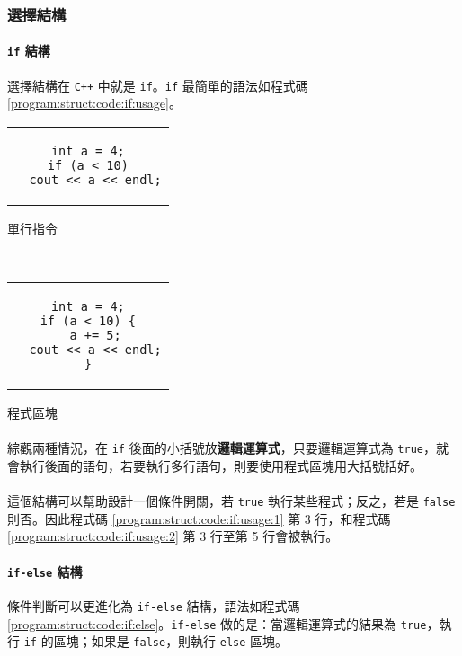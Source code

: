 \documentclass[12pt,a4paper,oneside]{article}
\begin{document}
\begin{CJK}{UTF8}{bkai}
\subsubsection{選擇結構}

\paragraph{\lstinline!if! 結構}選擇結構在 \texttt{C++} 中就是 \lstinline!if!。\lstinline!if! 最簡單的語法如程式碼 \ref{program:struct:code:if:usage}。

\begin{code}[h!]
\centering
\begin{subcode}{.4\textwidth}
  \centering
  \begin{tabular}{c}
  \begin{lstlisting}
int a = 4;
if (a < 10)
  cout << a << endl;
  \end{lstlisting}
  \end{tabular}
  \caption{單行指令}
  \label{program:struct:code:if:usage:1}
\end{subcode}
~
\begin{subcode}{.4\textwidth}
  \centering
  \begin{tabular}{c}
  \begin{lstlisting}
int a = 4;
if (a < 10) {
  a += 5;
  cout << a << endl;
}
  \end{lstlisting}
  \end{tabular}
  \caption{程式區塊}
  \label{program:struct:code:if:usage:2}
\end{subcode}
\caption{\lstinline!if! 的用法}
\label{program:struct:code:if:usage}
\end{code}

\paragraph{}綜觀兩種情況，在 \lstinline!if! 後面的小括號放\textbf{邏輯運算式}，只要邏輯運算式為 \lstinline!true!，就會執行後面的語句，若要執行多行語句，則要使用程式區塊用大括號括好。
\paragraph{}這個結構可以幫助設計一個條件開關，若 \lstinline!true! 執行某些程式；反之，若是 \lstinline!false! 則否。因此程式碼 \ref{program:struct:code:if:usage:1} 第 3 行，和程式碼 \ref{program:struct:code:if:usage:2} 第 3 行至第 5 行會被執行。

\paragraph{\lstinline!if!\texttt{-}\lstinline!else! 結構} 條件判斷可以更進化為 \lstinline!if!\texttt{-}\lstinline!else! 結構，語法如程式碼 \ref{program:struct:code:if:else}。\lstinline!if!\texttt{-}\lstinline!else! 做的是：當邏輯運算式的結果為 \lstinline!true!，執行 \lstinline!if! 的區塊；如果是 \lstinline!false!，則執行 \lstinline!else! 區塊。


\end{CJK}
\end{document}
